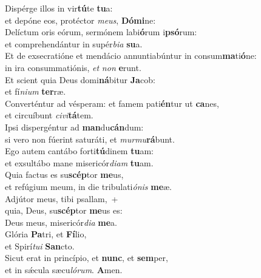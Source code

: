 \evenverse Dispérge illos in vir\textbf{tú}te \textbf{tu}a:~\*\\
\evenverse et depóne eos, protéctor \textit{me}\textit{us}, \textbf{Dó}\textbf{mi}ne:\\
\oddverse Delíctum oris eórum, sermónem labi\textbf{ó}rum i\textbf{psó}rum:~\*\\
\oddverse et comprehendántur in supér\textit{bi}\textit{a} \textbf{su}a.\\
\evenverse Et de exsecratióne et mendácio annuntiabúntur in consum\textbf{ma}ti\textbf{ó}ne:~\*\\
\evenverse in ira consummatiónis, \textit{et} \textit{non} \textbf{e}runt.\\
\oddverse Et scient quia Deus domi\textbf{ná}bitur \textbf{Ja}cob:~\*\\
\oddverse et fí\textit{ni}\textit{um} \textbf{ter}ræ.\\
\evenverse Converténtur ad vésperam: et famem pati\textbf{én}tur ut \textbf{ca}nes,~\*\\
\evenverse et circuíbunt \textit{ci}\textit{vi}\textbf{tá}tem.\\
\oddverse Ipsi dispergéntur ad \textbf{man}du\textbf{cán}dum:~\*\\
\oddverse si vero non fúerint saturáti, et \textit{mur}\textit{mu}\textbf{rá}bunt.\\
\evenverse Ego autem cantábo forti\textbf{tú}dinem \textbf{tu}am:~\*\\
\evenverse et exsultábo mane misericór\textit{di}\textit{am} \textbf{tu}am.\\
\oddverse Quia factus es su\textbf{scép}tor \textbf{me}us,~\*\\
\oddverse et refúgium meum, in die tribulati\textit{ó}\textit{nis} \textbf{me}æ.\\
\evenverse Adjútor meus, tibi psallam,~+\\
\evenverse  quia, Deus, su\textbf{scép}tor \textbf{me}us es:~\*\\
\evenverse Deus meus, misericór\textit{di}\textit{a} \textbf{me}a.\\
\oddverse Glória \textbf{Pa}tri, et \textbf{Fí}lio,~\*\\
\oddverse et Spirí\textit{tu}\textit{i} \textbf{San}cto.\\
\evenverse Sicut erat in princípio, et \textbf{nunc}, et \textbf{sem}per,~\*\\
\evenverse et in sǽcula sæcu\textit{ló}\textit{rum}. \textbf{A}men.\\
